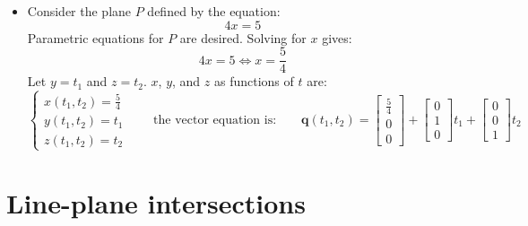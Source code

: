 \documentclass{article}
\begin{document}
\begin{itemize}
\item Consider the plane \(P\) defined by the equation:
\[4x = 5\]
Parametric equations for \(P\) are desired. 
Solving for \(x\) gives:
\[4x = 5 \iff x = \frac{5}{4}\]    
Let \(y = t_1\) and \(z = t_2\). \(x\), \(y\), and \(z\) as functions of \(t\) are:
\[\left\{\begin{array}{c}
x(t_1, t_2) = \frac{5}{4} \\ 
y(t_1, t_2) = t_1 \\ 
z(t_1, t_2) = t_2
\end{array}\right.
\quad\quad\text{the vector equation is:}\quad\quad
\mathbf{q}(t_1, t_2) = \begin{bmatrix} \frac{5}{4} \\ 0 \\ 0 \end{bmatrix} + \begin{bmatrix} 0 \\ 1 \\ 0 \end{bmatrix} t_1 + \begin{bmatrix} 0 \\ 0 \\ 1 \end{bmatrix}t_2\]
\end{itemize}




\section*{Line-plane intersections}
\end{document}
